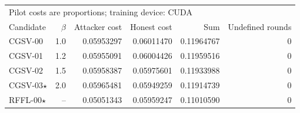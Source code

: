 \begin{tabular}{lrrrrr}
\toprule
\multicolumn{6}{l}{Pilot costs are proportions; training device: CUDA} \\
Candidate & $\beta$ & Attacker cost & Honest cost & Sum & Undefined rounds \\
\midrule
CGSV-00 & 1.0 & 0.05953297 & 0.06011470 & 0.11964767 & 0 \\
CGSV-01 & 1.2 & 0.05955091 & 0.06004426 & 0.11959516 & 0 \\
CGSV-02 & 1.5 & 0.05958387 & 0.05975601 & 0.11933988 & 0 \\
CGSV-03$\star$ & 2.0 & 0.05965481 & 0.05949259 & 0.11914739 & 0 \\
RFFL-00$\star$ & -- & 0.05051343 & 0.05959247 & 0.11010590 & 0 \\
\bottomrule
\end{tabular}
